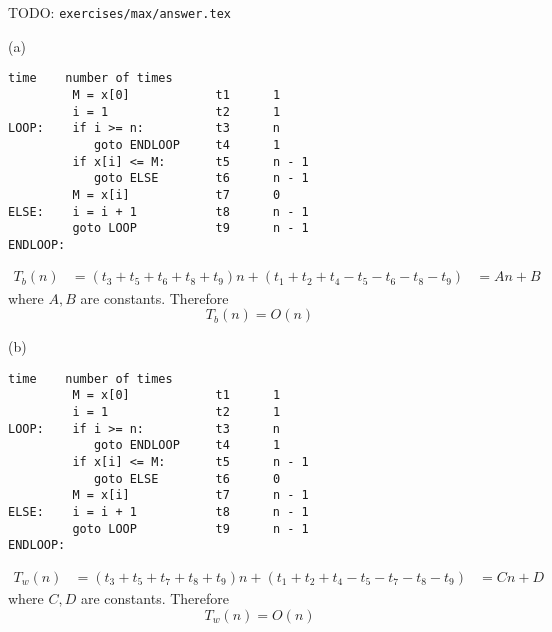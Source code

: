 TODO: \verb!exercises/max/answer.tex!

(a)
\begin{Verbatim}[frame=single,fontsize=\small]
                             time    number of times
         M = x[0]            t1      1 
         i = 1               t2      1
LOOP:    if i >= n:          t3      n
            goto ENDLOOP     t4      1
         if x[i] <= M:       t5      n - 1
            goto ELSE        t6      n - 1
         M = x[i]            t7      0
ELSE:    i = i + 1           t8      n - 1
         goto LOOP           t9      n - 1
ENDLOOP:
\end{Verbatim}
\begin{align*}
T_b(n)
&= (t_3 + t_5 + t_6 + t_8 + t_9)n + (t_1 + t_2 + t_4 - t_5 - t_6 - t_8 - t_9)
&= An + B
\end{align*}
where $A, B$ are constants.
Therefore
\[
T_b(n) = O(n)
\]

(b)
\begin{Verbatim}[frame=single,fontsize=\small]
                             time    number of times
         M = x[0]            t1      1 
         i = 1               t2      1
LOOP:    if i >= n:          t3      n
            goto ENDLOOP     t4      1
         if x[i] <= M:       t5      n - 1
            goto ELSE        t6      0
         M = x[i]            t7      n - 1
ELSE:    i = i + 1           t8      n - 1
         goto LOOP           t9      n - 1
ENDLOOP:
\end{Verbatim}
\begin{align*}
T_w(n)
&= (t_3 + t_5 + t_7 + t_8 + t_9)n + (t_1 + t_2 + t_4 - t_5 - t_7 - t_8 - t_9)
&= Cn + D
\end{align*}
where $C, D$ are constants.
Therefore
\[
T_w(n) = O(n)
\]
